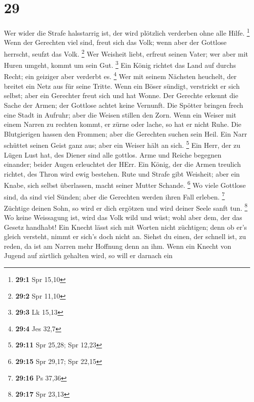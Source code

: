 \hypertarget{section-13}{%
\section{29}\label{section-13}}

 Wer wider die Strafe halsstarrig ist, der wird plötzlich
verderben ohne alle Hilfe. \footnote{\textbf{29:1} Spr 15,10}
 Wenn der Gerechten viel sind, freut sich das Volk; wenn
aber der Gottlose herrscht, seufzt das Volk. \footnote{\textbf{29:2} Spr
  11,10}  Wer Weisheit liebt, erfreut seinen Vater; wer aber
mit Huren umgeht, kommt um sein Gut. \footnote{\textbf{29:3} Lk 15,13}
 Ein König richtet das Land auf durchs Recht; ein geiziger
aber verderbt es. \footnote{\textbf{29:4} Jes 32,7}  Wer mit
seinem Nächsten heuchelt, der breitet ein Netz aus für seine Tritte.
 Wenn ein Böser sündigt, verstrickt er sich selbst; aber ein
Gerechter freut sich und hat Wonne.  Der Gerechte erkennt
die Sache der Armen; der Gottlose achtet keine Vernunft. 
Die Spötter bringen frech eine Stadt in Aufruhr; aber die Weisen stillen
den Zorn.  Wenn ein Weiser mit einem Narren zu rechten
kommt, er zürne oder lache, so hat er nicht Ruhe.  Die
Blutgierigen hassen den Frommen; aber die Gerechten suchen sein Heil.
 Ein Narr schüttet seinen Geist ganz aus; aber ein Weiser
hält an sich. \footnote{\textbf{29:11} Spr 25,28; Spr 12,23}
 Ein Herr, der zu Lügen Lust hat, des Diener sind alle
gottlos.  Arme und Reiche begegnen einander; beider Augen
erleuchtet der HErr.  Ein König, der die Armen treulich
richtet, des Thron wird ewig bestehen.  Rute und Strafe
gibt Weisheit; aber ein Knabe, sich selbst überlassen, macht seiner
Mutter Schande. \footnote{\textbf{29:15} Spr 29,17; Spr 22,15}
 Wo viele Gottlose sind, da sind viel Sünden; aber die
Gerechten werden ihren Fall erleben. \footnote{\textbf{29:16} Ps 37,36}
 Züchtige deinen Sohn, so wird er dich ergötzen und wird
deiner Seele sanft tun. \footnote{\textbf{29:17} Spr 23,13}
 Wo keine Weissagung ist, wird das Volk wild und wüst; wohl
aber dem, der das Gesetz handhabt!  Ein Knecht lässt sich
mit Worten nicht züchtigen; denn ob er's gleich versteht, nimmt er
sich's doch nicht an.  Siehst du einen, der schnell ist, zu
reden, da ist am Narren mehr Hoffnung denn an ihm.  Wenn
ein Knecht von Jugend auf zärtlich gehalten wird, so will er darnach ein
